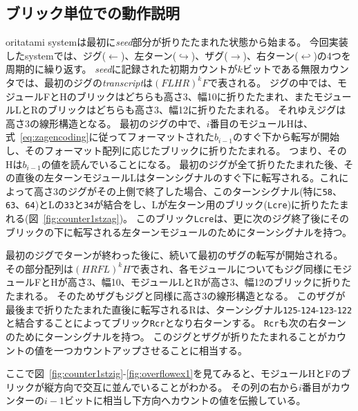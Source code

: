 \documentclass[a4,11pt]{article}
\begin{document}
%
%
\newpage
%
\subsection{ブリック単位での動作説明}
oritatami systemは最初に\textit{seed}部分が折りたたまれた状態から始まる。
今回実装したsystemでは、ジグ($\leftarrow$)、左ターン($\hookrightarrow$)、ザグ($\rightarrow$)、右ターン($\hookleftarrow$)の4つを周期的に繰り返す。
\textit{seed}に記録された初期カウントが$k$ビットである無限カウンタでは、最初のジグの\textit{transcript}は$(FLHR)^k F$で表される。
ジグの中では、モジュールFとHのブリックはどちらも高さ3、幅10に折りたたまれ、またモジュールLとRのブリックはどちらも高さ3、幅12に折りたたまれる。
それゆえジグは高さ3の線形構造となる。
最初のジグの中で、$i$番目のモジュールHは、式~\ref{eq:zagencoding}に従ってフォーマットされた$b_{i-1}$のすぐ下から転写が開始し、そのフォーマット配列に応じたブリックに折りたたまれる。
つまり、そのHは$b_{i-1}$の値を読んでいることになる。
最初のジグが全て折りたたまれた後、その直後の左ターンモジュールLはターンシグナルのすぐ下に転写される。これによって高さ3のジグがその上側で終了した場合、このターンシグナル(特に\texttt{58}、\texttt{63}、\texttt{64})とLの\texttt{33}と\texttt{34}が結合をし、Lが左ターン用のブリック(\texttt{Lcre})に折りたたまれる(図~\ref{fig:counter1stzag})。
このブリック\texttt{Lcre}は、更に次のジグ終了後にそのブリックの下に転写される左ターンモジュールのためにターンシグナルを持つ。

最初のジグでターンが終わった後に、続いて最初のザグの転写が開始される。
その部分配列は$(HRFL)^k H$で表され、各モジュールについてもジグ同様にモジュールFとHが高さ3、幅10、モジュールLとRが高さ3、幅12のブリックに折りたたまれる。
そのためザグもジグと同様に高さ3の線形構造となる。
このザグが最後まで折りたたまれた直後に転写されるRは、ターンシグナル\texttt{125}-\texttt{124}-\texttt{123}-\texttt{122}と結合することによってブリック\texttt{Rcr}となり右ターンする。
\texttt{Rcr}も次の右ターンのためにターンシグナルを持つ。
このジグとザグが折りたたまれることがカウントの値を一つカウントアップさせることに相当する。

ここで図~\ref{fig:counter1stzig}-\ref{fig:overflowex1}を見てみると、モジュールHとFのブリックが縦方向で交互に並んでいることがわかる。
その列の右から$i$番目がカウンターの$i{-}1$ビットに相当し下方向へカウントの値を伝搬している。


\end{document}
